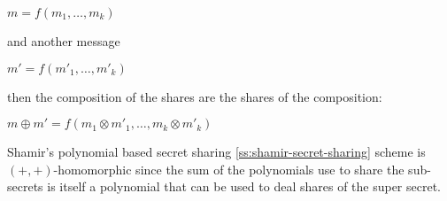 \hfil $m = f(m_1, \dots, m_k)$

and another message

\hfil  $m' = f(m'_1, \dots, m'_k)$

then the composition of the shares are the shares of the composition:

\hfil $m \oplus m' = f(m_1 \otimes m'_1, \dots, m_k \otimes m'_k)$


Shamir’s polynomial based secret sharing \ref{ss:shamir-secret-sharing} scheme is $(+, +)$-homomorphic since the sum of the polynomials use to share the sub-secrets is itself a polynomial that can be used to deal shares of the super secret.


